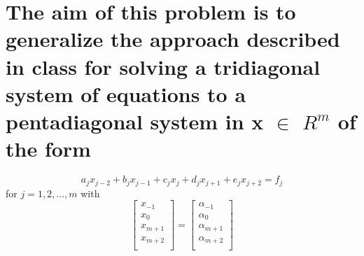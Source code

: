 \documentclass[12pt]{article}
\begin{document}
    \section{The aim of this problem is to generalize the approach described in class
    for solving a tridiagonal system of equations to a pentadiagonal system in x $\in$ $R^m$
    of the form}
        $$a_jx_{j-2} + b_jx_{j-1} + c_jx_j + d_jx_{j+1} + e_jx_{j+2} = f_j$$
        for $j = 1, 2, . . . , m$ with
        \begin{equation*}
            \left[
            \begin{array}{c}
                x_{-1}\\
                x_{0}\\
                x_{m+1}\\
                x_{m+2}\\
            \end{array}
            \right]
            =
            \left[
            \begin{array}{c}
                \alpha_{-1}\\
                \alpha_{0}\\
                \alpha_{m+1}\\
                \alpha_{m+2}\\
            \end{array}
            \right]
        \end{equation*}
\end{document}
